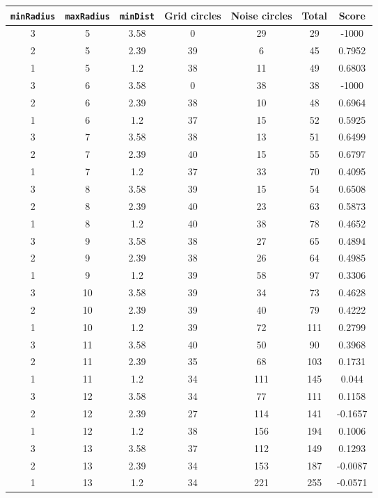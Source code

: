\documentclass[letterpaper, 12pt]{article}
\begin{document}
\begin{longtable}{|c|c|c|c|c|c|c|}
\hline
\textbf{\texttt{minRadius}} & \textbf{\texttt{maxRadius}} & \textbf{\texttt{minDist}} & \textbf{Grid circles} & \textbf{Noise circles} & \textbf{Total} & \textbf{Score} \\
\hline
3 & 5 & 3.58 & 0 & 29 & 29 & -1000 \\
\hline
2 & 5 & 2.39 & 39 & 6 & 45 & 0.7952 \\
\hline
1 & 5 & 1.2 & 38 & 11 & 49 & 0.6803 \\
\hline
3 & 6 & 3.58 & 0 & 38 & 38 & -1000 \\
\hline
2 & 6 & 2.39 & 38 & 10 & 48 & 0.6964 \\
\hline
1 & 6 & 1.2 & 37 & 15 & 52 & 0.5925 \\
\hline
3 & 7 & 3.58 & 38 & 13 & 51 & 0.6499 \\
\hline
2 & 7 & 2.39 & 40 & 15 & 55 & 0.6797 \\
\hline
1 & 7 & 1.2 & 37 & 33 & 70 & 0.4095 \\
\hline
3 & 8 & 3.58 & 39 & 15 & 54 & 0.6508 \\
\hline
2 & 8 & 2.39 & 40 & 23 & 63 & 0.5873 \\
\hline
1 & 8 & 1.2 & 40 & 38 & 78 & 0.4652 \\
\hline
3 & 9 & 3.58 & 38 & 27 & 65 & 0.4894 \\
\hline
2 & 9 & 2.39 & 38 & 26 & 64 & 0.4985 \\
\hline
1 & 9 & 1.2 & 39 & 58 & 97 & 0.3306 \\
\hline
3 & 10 & 3.58 & 39 & 34 & 73 & 0.4628 \\
\hline
2 & 10 & 2.39 & 39 & 40 & 79 & 0.4222 \\
\hline
1 & 10 & 1.2 & 39 & 72 & 111 & 0.2799 \\
\hline
3 & 11 & 3.58 & 40 & 50 & 90 & 0.3968 \\
\hline
2 & 11 & 2.39 & 35 & 68 & 103 & 0.1731 \\
\hline
1 & 11 & 1.2 & 34 & 111 & 145 & 0.044 \\
\hline
3 & 12 & 3.58 & 34 & 77 & 111 & 0.1158 \\
\hline
2 & 12 & 2.39 & 27 & 114 & 141 & -0.1657 \\
\hline
1 & 12 & 1.2 & 38 & 156 & 194 & 0.1006 \\
\hline
3 & 13 & 3.58 & 37 & 112 & 149 & 0.1293 \\
\hline
2 & 13 & 2.39 & 34 & 153 & 187 & -0.0087 \\
\hline
1 & 13 & 1.2 & 34 & 221 & 255 & -0.0571 \\

\end{longtable}
\end{document}
